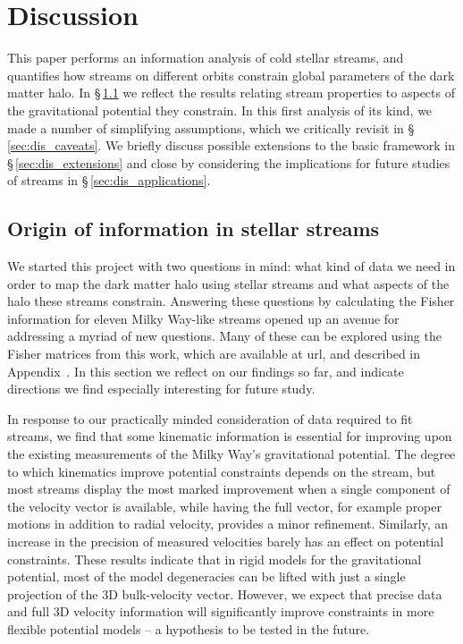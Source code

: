 \documentclass[modern]{aastex61}
\begin{document}
\section{Discussion}
\label{sec:discussion}
This paper performs an information analysis of cold stellar streams, and quantifies how streams on different orbits constrain global parameters of the dark matter halo.
In \S\,\ref{sec:dis_origin} we reflect the results relating stream properties to aspects of the gravitational potential they constrain.
In this first analysis of its kind, we made a number of simplifying assumptions, which we critically revisit in \S\,\ref{sec:dis_caveats}.
We briefly discuss possible extensions to the basic framework in \S\,\ref{sec:dis_extensions} and close by considering the implications for future studies of streams in \S\,\ref{sec:dis_applications}.

\subsection{Origin of information in stellar streams}
\label{sec:dis_origin}
We started this project with two questions in mind: what kind of data we need in order to map the dark matter halo using stellar streams and what aspects of the halo these streams constrain.
Answering these questions by calculating the Fisher information for eleven Milky Way-like streams opened up an avenue for addressing a myriad of new questions.
Many of these can be explored using the Fisher matrices from this work, which are available at url, and described in Appendix~.
In this section we reflect on our findings so far, and indicate directions we find especially interesting for future study.

In response to our practically minded consideration of data required to fit streams, we find that some kinematic information is essential for improving upon the existing measurements of the Milky Way's gravitational potential.
The degree to which kinematics improve potential constraints depends on the stream, but most streams display the most marked improvement when a single component of the velocity vector is available, while having the full vector, for example proper motions in addition to radial velocity, provides a minor refinement.
Similarly, an increase in the precision of measured velocities barely has an effect on potential constraints.
These results indicate that in rigid models for the gravitational potential, most of the model degeneracies can be lifted with just a single projection of the 3D bulk-velocity vector.
However, we expect that precise data and full 3D velocity information will significantly improve constraints in more flexible potential models  -- a hypothesis to be tested in the future.
\end{document}
